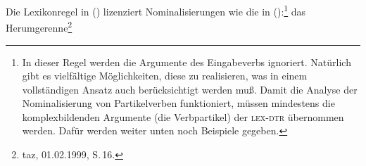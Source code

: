 \begin{comment}
As is clear from looking at the examples discussed
in the data section, there are various ways in which
the arguments of a verb can be realized after nominalization has been applied.
The subject or object of the verb can be realized as a \emph{von}"=PP (\mex{1}a), as a postnominal
genitive NP (\mex{1}b), or it may be left implicit (\mex{1}c).
\eal
\ex\iw{Angebrülle}
das Angebrülle von Norbert\footnote{
        taz, 15.10.1993, S.\,16.%
}
\ex\iw{Rumgeheule}
das Rumgeheule der FDP\footnote{
        taz, 07.01.1998, S.\,3.%
}
\ex\iw{Herumgerenne}
das Herumgerenne\footnote{
        taz, 01.02.1999, S.\,16.%
}
\label{ex-herumgerenne-zwei}
\zl
Rather than giving a detailed account of the various ways in which arguments
can be realized, I will consider the case where all arguments are suppressed.
The main purpose of this subsection is not to provide all the details of argument realizations
in nominal environments, but rather to show how \geens can be accounted
for without any bracketing paradox.
\end{comment}

Die
Lexikonregel in () lizenziert Nominalisierungen
wie die in ():\footnote{
  In dieser Regel werden die Argumente des Eingabeverbs ignoriert. Natürlich
  gibt es vielfältige Möglichkeiten, diese zu realisieren, was in einem vollständigen
  Ansatz auch berücksichtigt werden muß. Damit die Analyse der Nominalisierung von Partikelverben
  funktioniert, müssen mindestens die komplexbildenden Argumente (die Verbpartikel) der \textsc{lex-dtr} übernommen werden. Dafür werden weiter unten noch Beispiele gegeben.%
}
\ea
das Herumgerenne\footnote{
        taz, 01.02.1999, S.\,16.%
}
\label{ex-herumgerenne-zwei}
\z

